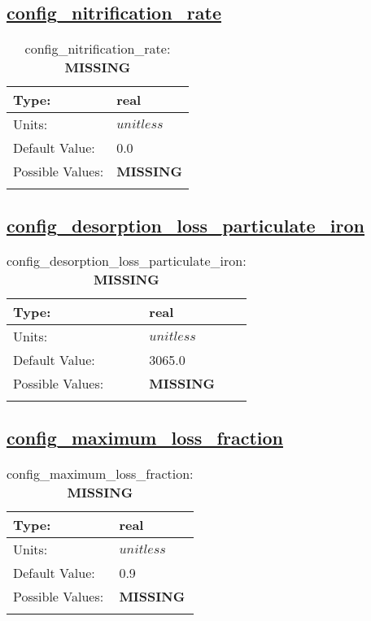\subsection[config\_nitrification\_rate]{\hyperref[sec:nm_tab_biogeochemistry]{config\_nitrification\_rate}}
\label{subsec:nm_sec_config_nitrification_rate}
\begin{center}
\begin{longtable}{| p{2.0in} || p{4.0in} |}
    \hline
    Type: & real \\
    \hline
    Units: & $unitless$ \\
    \hline
    Default Value: & 0.0 \\
    \hline
    Possible Values: & {\bf \color{red} MISSING} \\
    \hline
    \caption{config\_nitrification\_rate: {\bf \color{red} MISSING}}
\end{longtable}
\end{center}
\subsection[config\_desorption\_loss\_particulate\_iron]{\hyperref[sec:nm_tab_biogeochemistry]{config\_desorption\_loss\_particulate\_iron}}
\label{subsec:nm_sec_config_desorption_loss_particulate_iron}
\begin{center}
\begin{longtable}{| p{2.0in} || p{4.0in} |}
    \hline
    Type: & real \\
    \hline
    Units: & $unitless$ \\
    \hline
    Default Value: & 3065.0 \\
    \hline
    Possible Values: & {\bf \color{red} MISSING} \\
    \hline
    \caption{config\_desorption\_loss\_particulate\_iron: {\bf \color{red} MISSING}}
\end{longtable}
\end{center}
\subsection[config\_maximum\_loss\_fraction]{\hyperref[sec:nm_tab_biogeochemistry]{config\_maximum\_loss\_fraction}}
\label{subsec:nm_sec_config_maximum_loss_fraction}
\begin{center}
\begin{longtable}{| p{2.0in} || p{4.0in} |}
    \hline
    Type: & real \\
    \hline
    Units: & $unitless$ \\
    \hline
    Default Value: & 0.9 \\
    \hline
    Possible Values: & {\bf \color{red} MISSING} \\
    \hline
    \caption{config\_maximum\_loss\_fraction: {\bf \color{red} MISSING}}
\end{longtable}
\end{center}
